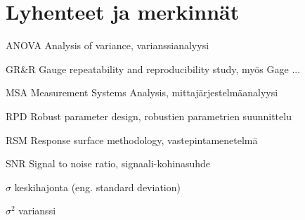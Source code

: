 \documentclass[12pt,a4paper,finnish]{tutthesis}
\begin{document}
%
%

\chapter*{Lyhenteet ja merkinnät}
\markboth{}{}                                %

\begin{termlist}
\item [ANOVA]      Analysis of variance, varianssianalyysi
\item [GR\&R] 	   Gauge repeatability and reproducibility study, myös Gage ...
\item [MSA]        Measurement Systems Analysis, mittajärjestelmäanalyysi
\item [RPD]        Robust parameter design, robustien parametrien suunnittelu
\item [RSM]        Response surface methodology, vastepintamenetelmä
\item [SNR]        Signal to noise ratio, signaali-kohinasuhde
\end{termlist} 

\begin{termlist}
\item [$\sigma$] keskihajonta (eng. standard deviation)
\item [$\sigma^2$] varianssi
\end{termlist} 



\cleardoublepage

\newpage             %
\setcounter{page}{1} %
\renewcommand{\chaptername}{} %
\end{document}
